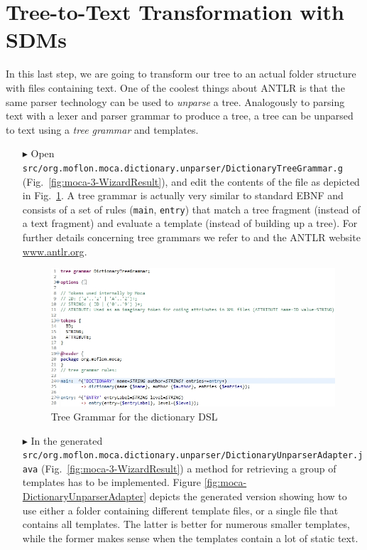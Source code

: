 \section{Tree-to-Text Transformation with SDMs}
\label{chap:tree-to-text}

In this last step, we are going to transform our tree to an actual folder structure with files containing text.
One of the coolest things about ANTLR is that the same parser technology can be used to \emph{unparse} a tree.
Analogously to parsing text with a lexer and parser grammar to produce a tree, a tree can be unparsed to text using a \emph{tree grammar} and templates.
\begin{enumerate}
\item[$\blacktriangleright$] Open \texttt{src/org.moflon.moca.dictionary.unparser/Dictionary\-Tree\-Grammar.g} (Fig.~\ref{fig:moca-3-WizardResult}), and edit the contents of the file as depicted in Fig.~\ref{fig:moca-DictionaryTreeGrammar}.
A tree grammar is actually very similar to standard EBNF and consists of a set of rules (\texttt{main}, \texttt{entry}) that match a tree fragment (instead of a text fragment) and evaluate a template (instead of building up a tree).
For further details concerning tree grammars we refer to \cite{ANTLR} and the
ANTLR website \url{www.antlr.org}.

\begin{figure}[!htbp]
\begin{center}
 \includegraphics[width=\textwidth]{pics/moca/5MocaTreeToText/DictionaryTreeGrammar}
  \caption{Tree Grammar for the dictionary DSL} 
  \label{fig:moca-DictionaryTreeGrammar}
\end{center}
\end{figure} 

\item[$\blacktriangleright$] In the generated \texttt{src/org.moflon.moca.dictionary.unparser/Dic\-tion\-ary\-Unparser\-Adapter.java} (Fig.~\ref{fig:moca-3-WizardResult}) a method for retrieving a group of templates has to be implemented.
Figure \ref{fig:moca-DictionaryUnparserAdapter} depicts the generated version showing how to use either a folder containing different template files, or a single file that contains all templates.
The latter is better for numerous smaller templates, while the former makes sense when the templates contain a lot of static text.


\end{enumerate}
